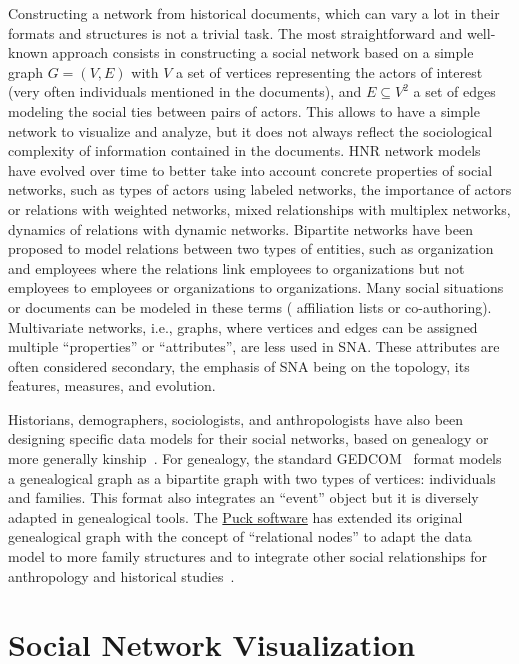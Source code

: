 Constructing a network from historical documents, which can vary a lot in their formats and structures is not a trivial task.
The most straightforward and well-known approach consists in constructing a social network based on a simple graph $G = (V, E)$ with $V$ a set of vertices representing the actors of interest (very often individuals mentioned in the documents), and $E \subseteq V^2$ a set of edges modeling the social ties between pairs of actors.
This allows to have a simple network to visualize and analyze, but it does not always reflect the sociological complexity of information contained in the documents.
HNR network models have evolved over time to better take into account concrete properties of social networks, such as types of actors using labeled networks, the importance of actors or relations with weighted networks, mixed relationships with multiplex networks, dynamics of relations with dynamic networks.
Bipartite networks have been proposed to model relations between two types of entities, such as organization and employees where the relations link employees to organizations but not employees to employees or organizations to organizations.
Many social situations or documents can be modeled in these terms (%
affiliation lists or co-authoring).
Multivariate networks, i.e.,  graphs, where vertices and edges can be assigned multiple ``properties'' or ``attributes'', are less used in SNA\@.
These attributes are often considered secondary, the emphasis of SNA being on the topology, its features, measures, and evolution.

Historians, demographers, sociologists, and anthropologists have also been designing specific data models for their social networks, based on genealogy or more generally kinship~\cite{hambergerKinshipNetworkAnalysis2011}.
For genealogy, the standard GEDCOM~\cite{gedcom} format models a genealogical graph as a bipartite graph with two types of vertices: individuals and families.
This format also integrates an ``event'' object but it is diversely adapted in genealogical tools.
The \href{https://www.kintip.net/}{Puck software} has extended its original genealogical graph with the concept of ``relational nodes'' to adapt the data model to more family structures and to integrate other social relationships for anthropology and historical studies~\cite{hambergerScanningPatternsRelationship2014}.


\section{Social Network Visualization}\label{sec:social-network-visualization}

